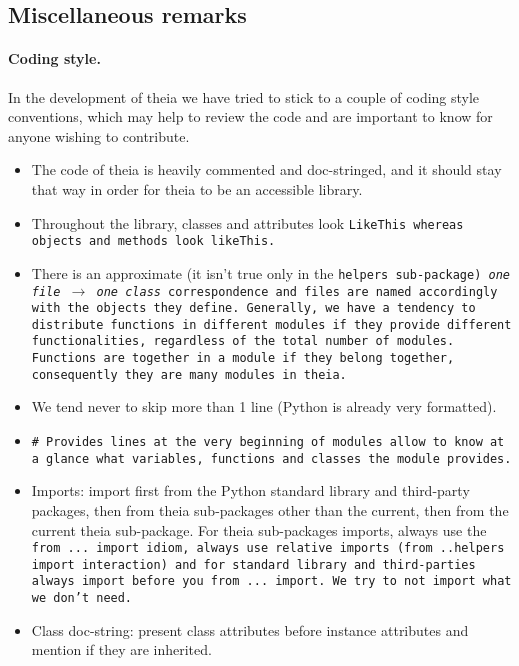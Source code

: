 \documentclass{article}
\begin{document}
\subsection{Miscellaneous remarks}

\paragraph{Coding style.}In the development of theia we have tried to stick to a couple of coding style conventions, which may help to review the code and are important to know for anyone wishing to contribute.

\begin{itemize}
\item The code of theia is heavily commented and doc-stringed, and it should stay that way in order for theia to be an accessible library.

\item Throughout the library, classes and attributes look \tt{LikeThis} whereas objects and methods look \tt{likeThis}.

\item There is an approximate (it isn't true only in the \tt{helpers} sub-package) \textit{one file} $\rightarrow$ \textit{one class} correspondence and files are named accordingly with the objects they define. Generally, we have a tendency to distribute functions in different modules if they provide different functionalities, regardless of the total number of modules. Functions are together in a module if they belong together, consequently they are many modules in theia.

\item We tend never to skip more than 1 line (Python is already very formatted).

\item \tt{\# Provides} lines at the very beginning of modules allow to know at a glance what variables, functions and classes the module provides.

\item Imports: import first from the Python standard library and third-party packages, then from theia sub-packages other than the current, then from the current theia sub-package. For theia sub-packages imports, always use the \tt{from ... import} idiom, always use relative imports (\tt{from ..helpers import interaction}) and for standard library and third-parties always \tt{import} before you \tt{from ... import}. We try to not import what we don't need.

\item Class doc-string: present class attributes before instance attributes and mention if they are inherited.
\end{itemize}
\end{document}
